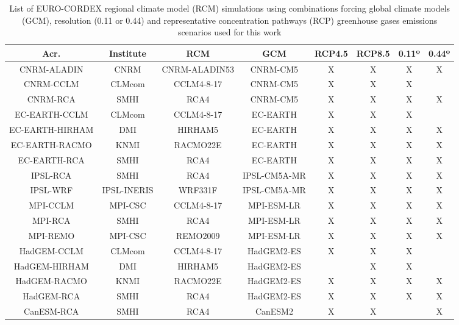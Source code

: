 


\newpage
\begin{table}
\caption{List of EURO-CORDEX regional climate model (RCM) simulations using combinations 
forcing global climate models (GCM), resolution (0.11 or 0.44) and representative concentration
pathways (RCP) greenhouse gases emissions scenarios used for this work}
\label{tabsim}       %


\renewcommand{\arraystretch}{1.5}

\begin{tabular}{|c|c|c|c|c|c|c|c|}

\hline
{Acr.}& {Institute}& {RCM}& {GCM} & {RCP4.5}& {RCP8.5} & {0.11º}& {0.44º}\\[5pt]
\hline
CNRM-ALADIN& CNRM& CNRM-ALADIN53& CNRM-CM5& X& X & X& X\\
\hline
CNRM-CCLM& CLMcom& CCLM4-8-17& CNRM-CM5& X& X & X& \\
\hline
CNRM-RCA& SMHI& RCA4& CNRM-CM5& X& X & X& X\\
\hline
EC-EARTH-CCLM& CLMcom& CCLM4-8-17 & EC-EARTH& X& X & X& \\
\hline
EC-EARTH-HIRHAM& DMI& HIRHAM5& EC-EARTH& X& X & X& X\\
\hline
EC-EARTH-RACMO& KNMI& RACMO22E& EC-EARTH& X& X & X& X\\
\hline
EC-EARTH-RCA& SMHI& RCA4& EC-EARTH& X& X & X& X\\
\hline
IPSL-RCA& SMHI& RCA4& IPSL-CM5A-MR& X& X & X& X\\
\hline
IPSL-WRF& IPSL-INERIS& WRF331F& IPSL-CM5A-MR& X& X & X& X\\
\hline
MPI-CCLM& MPI-CSC& CCLM4-8-17& MPI-ESM-LR& X& X & X& X\\
\hline
MPI-RCA& SMHI& RCA4& MPI-ESM-LR& X& X & X& X\\
\hline
MPI-REMO& MPI-CSC& REMO2009& MPI-ESM-LR& X& X & X& X\\
\hline
HadGEM-CCLM& CLMcom& CCLM4-8-17& HadGEM2-ES& X& X & X& \\
\hline
HadGEM-HIRHAM& DMI& HIRHAM5& HadGEM2-ES& & X & X& \\
\hline
HadGEM-RACMO& KNMI& RACMO22E& HadGEM2-ES& X& X & X& X\\
\hline
HadGEM-RCA& SMHI& RCA4& HadGEM2-ES& X& X & X& X\\
\hline
CanESM-RCA& SMHI &RCA4 &CanESM2 & X& X & & X\\
\hline 

\end{tabular}
\end{table}


